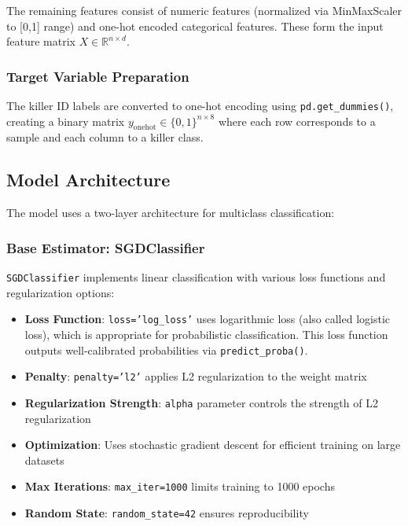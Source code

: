 \documentclass[12pt]{article}
\begin{document}
The remaining features consist of numeric features (normalized via MinMaxScaler to [0,1] range) and one-hot encoded categorical features. These form the input feature matrix $X \in \mathbb{R}^{n \times d}$.

\subsubsection{Target Variable Preparation}

The killer ID labels are converted to one-hot encoding using \texttt{pd.get\_dummies()}, creating a binary matrix $y_{\text{onehot}} \in \{0, 1\}^{n \times 8}$ where each row corresponds to a sample and each column to a killer class.

\subsection{Model Architecture}

The model uses a two-layer architecture for multiclass classification:

\subsubsection{Base Estimator: SGDClassifier}

\texttt{SGDClassifier} implements linear classification with various loss functions and regularization options:
\begin{itemize}
    \item \textbf{Loss Function}: \texttt{loss='log\_loss'} uses logarithmic loss (also called logistic loss), which is appropriate for probabilistic classification. This loss function outputs well-calibrated probabilities via \texttt{predict\_proba()}.
    \item \textbf{Penalty}: \texttt{penalty='l2'} applies L2 regularization to the weight matrix
    \item \textbf{Regularization Strength}: \texttt{alpha} parameter controls the strength of L2 regularization
    \item \textbf{Optimization}: Uses stochastic gradient descent for efficient training on large datasets
    \item \textbf{Max Iterations}: \texttt{max\_iter=1000} limits training to 1000 epochs
    \item \textbf{Random State}: \texttt{random\_state=42} ensures reproducibility
\end{itemize}
\end{document}
